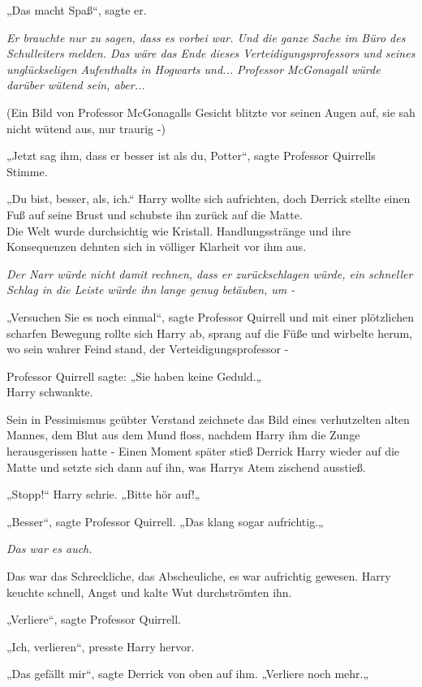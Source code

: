 {„Das macht Spaß“, sagte er.

\emph{Er brauchte nur zu sagen, dass es vorbei war. Und die ganze Sache im Büro des Schulleiters melden. Das wäre das Ende dieses Verteidigungsprofessors und seines unglückseligen Aufenthalts in Hogwarts und... Professor McGonagall würde darüber wütend sein, aber...}

(Ein Bild von Professor McGonagalls Gesicht blitzte vor seinen Augen auf, sie sah nicht wütend aus, nur traurig -)

„Jetzt sag ihm, dass er besser ist als du, Potter“, sagte Professor Quirrells Stimme.

„Du bist, besser, als, ich.“ Harry wollte sich aufrichten, doch Derrick stellte einen Fuß auf seine Brust und schubste ihn zurück auf die Matte.\\ Die Welt wurde durchsichtig wie Kristall. Handlungsstränge und ihre Konsequenzen dehnten sich in völliger Klarheit vor ihm aus.

\emph{Der Narr würde nicht damit rechnen, dass er zurückschlagen würde, ein schneller Schlag in die Leiste würde ihn lange genug betäuben, um -}

„Versuchen Sie es noch einmal“, sagte Professor Quirrell und mit einer plötzlichen scharfen Bewegung rollte sich Harry ab, sprang auf die Füße und wirbelte herum, wo sein wahrer Feind stand, der Verteidigungsprofessor -

Professor Quirrell sagte: „Sie haben keine Geduld.„\\ Harry schwankte.

Sein in Pessimismus geübter Verstand zeichnete das Bild eines verhutzelten alten Mannes, dem Blut aus dem Mund floss, nachdem Harry ihm die Zunge herausgerissen hatte - Einen Moment später stieß Derrick Harry wieder auf die Matte und setzte sich dann auf ihn, was Harrys Atem zischend ausstieß.

„Stopp!“ Harry schrie. „Bitte hör auf!„

„Besser“, sagte Professor Quirrell. „Das klang sogar aufrichtig.„

\emph{Das war es auch.}

Das war das Schreckliche, das Abscheuliche, es war aufrichtig gewesen. Harry keuchte schnell, Angst und kalte Wut durchströmten ihn.

„Verliere“, sagte Professor Quirrell.

„Ich, verlieren“, presste Harry hervor.

„Das gefällt mir“, sagte Derrick von oben auf ihm. „Verliere noch mehr.„

}
